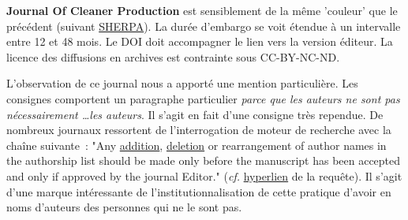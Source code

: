 \textbf{Journal Of Cleaner Production} est sensiblement de la même 'couleur' que le précédent (suivant \href{http://www.sherpa.ac.uk/romeo/search.php?issn=0959-6526}{SHERPA}).
La durée d'embargo se voit étendue à un intervalle entre 12 et 48 mois.
Le DOI doit accompagner le lien vers la version éditeur.
La licence des diffusions en archives est contrainte sous CC-BY-NC-ND.

L'observation de ce journal nous a apporté une mention particulière.
Les consignes comportent un paragraphe particulier \textit{parce que les auteurs ne sont pas nécessairement \ldots les auteurs}.
Il s'agit en fait d'une consigne très rependue.
De nombreux journaux ressortent de l'interrogation de moteur de recherche avec la chaîne suivante~:
"Any \underline{addition}, \underline{deletion} or rearrangement of author names in the authorship list should be made only before the manuscript has been accepted and only if approved by the journal Editor." (\textit{cf.} \href{https://duckduckgo.com/?q=\%22Any+addition\%2C+deletion+or+rearrangement+of+author+names+in+the+authorship+list+should+be+made+only+before+the+manuscript+has+been+accepted+and+only+if+approved+by+the+journal+Editor.\%22&t=ffab&ia=web}{hyperlien} de la requête).
Il s'agit d'une marque intéressante de l'institutionnalisation de cette pratique d'avoir en noms d'auteurs des personnes qui ne le sont pas.

